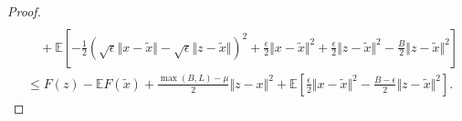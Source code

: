 \documentclass[12pt]{article}
\newcommand{\expect}{\ensuremath{\mathbb E}}
\begin{document}
\begin{proof}
\begin{align*}
                    \\ &\quad 
                    + \expect\left[
                        - \frac{1}{2}\left(
                            \sqrt{\epsilon}\Vert x - \tilde x\Vert - \sqrt{\epsilon}\Vert z - \tilde x\Vert
                        \right)^2
                        + \frac{\epsilon}{2}\Vert x - \tilde x\Vert^2 + \frac{\epsilon}{2}\Vert z - \tilde x\Vert^2
                        - \frac{B}{2} \Vert z - \tilde x\Vert^2
                    \right]
                \\
                &\le 
                F(z) - \expect F(\tilde x) + \frac{\max(B, L) - \mu}{2}\Vert z - x\Vert^2 
                + \expect\left[
                    \frac{\epsilon}{2}\Vert x - \tilde x\Vert^2
                    - \frac{B - \epsilon}{2} \Vert z - \tilde x\Vert^2
                \right]. 
            \end{align*}
        \end{proof}
\end{document}

